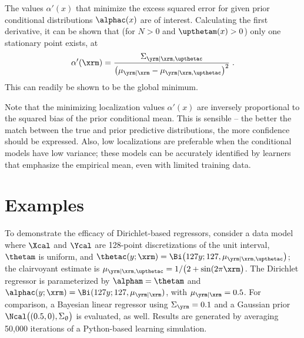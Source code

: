\documentclass{article}
\begin{document}
	The values $\alpha'(x)$ that minimize the excess squared error for given prior conditional distributions $\alphac(x)$ are of interest. Calculating the first derivative, it can be shown that (for $N > 0$ and $\upthetam(x) > 0$) only one stationary point exists, at 
	\begin{equation} \label{eq:alpha_x_min_Rex}
		\alpha'(\xrm) = \frac{\Sigma_{\yrm | \xrm,\upthetac}}{\left( \mu_{\yrm | \xrm} - \mu_{\yrm | \xrm,\upthetac} \right)^2} \;.
	\end{equation}
	This can readily be shown to be the global minimum.
	
	Note that the minimizing localization values $\alpha'(x)$ are inversely proportional to the squared bias of the prior conditional mean. This is sensible -- the better the match between the true and prior predictive distributions, the more confidence should be expressed. Also, low localizations are preferable when the conditional models have low variance; these models can be accurately identified by learners that emphasize the empirical mean, even with limited training data. 
	
	
	\section{Examples}
	To demonstrate the efficacy of Dirichlet-based regressors, consider a data model where $\Xcal$ and $\Ycal$ are 128-point discretizations of the unit interval, $\thetam$ is uniform, and $\thetac(y; \xrm) = \Bi\big(127y; 127, \mu_{\yrm | \xrm,\upthetac}\big)$; the clairvoyant estimate is $\mu_{\yrm | \xrm,\upthetac} = 1 / \big(2 + \sin(2\pi \xrm\big)$. The Dirichlet regressor is parameterized by $\alpham = \thetam$ and $\alphac(y; \xrm) = \Bi(127y; 127, \mu_{\yrm | \xrm})$, with $\mu_{\yrm | \xrm} = 0.5$. For comparison, a Bayesian linear regressor \cite{theodoridis-ML} using $\Sigma_{\yrm}=0.1$ and a Gaussian prior $\Ncal\big((0.5, 0), \Sigma_{\uptheta}\big)$ is evaluated, as well. Results are generated by averaging 50,000 iterations of a Python-based learning simulation.
	
\end{document}
